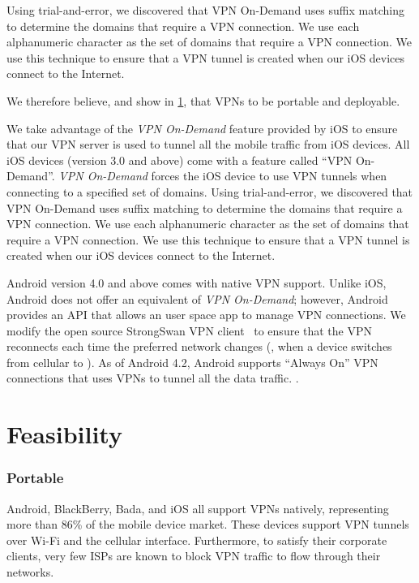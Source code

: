 Using trial-and-error, we
discovered that VPN On-Demand uses suffix matching to determine the domains
that require a VPN connection. We use each alphanumeric character as the
set of domains that require a VPN connection. We use this technique to
ensure that a VPN tunnel is created when our iOS devices connect to the
Internet. 


We therefore believe, and show in \ref{sec:feasibility}, that   VPNs to be portable and
deployable. 

We take advantage of the \emph{VPN On-Demand} feature provided by iOS to
ensure that our VPN server is used to tunnel all the mobile traffic from
iOS devices. All iOS devices (version 3.0 and above) come with a feature
called ``VPN On-Demand''. \emph{VPN On-Demand} forces the iOS device to use
VPN tunnels when connecting to a specified set of domains. Using
trial-and-error, we discovered that VPN On-Demand uses suffix matching to
determine the domains that require a VPN connection. We use each
alphanumeric character as the set of domains that require a VPN connection.
We use this technique to ensure that a VPN tunnel is created when our iOS
devices connect to the Internet. 

Android version 4.0 and above comes with native VPN support. Unlike iOS,
Android does not offer an equivalent of \emph{VPN On-Demand}; however,
Android provides an API that allows an user space app to  manage VPN
connections. We modify the open source StrongSwan VPN
client~\cite{strongswanclient} to ensure that the VPN reconnects each time
the preferred network changes (\eg, when a device switches from cellular to
\wifi). As of Android 4.2, Android supports ``Always On'' VPN connections
that uses VPNs to tunnel all the data traffic. .

\section{Feasibility}
\label{sec:feasibility}

\subsubsection{Portable} 
Android, BlackBerry, Bada, and iOS all support VPNs natively, representing
more than 86\% of the mobile device market\cite{gartner-phone-share}. These
devices support VPN tunnels over Wi-Fi and the cellular interface.
Furthermore, to satisfy their corporate clients, very few ISPs are known to
block VPN traffic to flow through their networks.  

